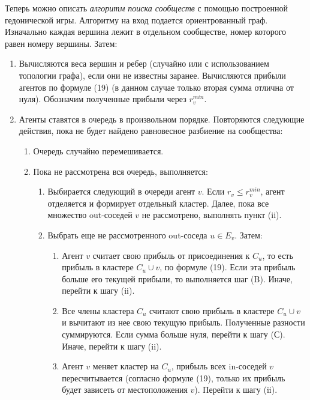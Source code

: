 Теперь можно описать \textit{алгоритм поиска сообществ} с помощью построенной гедонической игры. Алгоритму на вход подается ориентрованный граф. Изначально каждая вершина лежит в отдельном сообществе, номер которого равен номеру вершины. Затем:
\begin{enumerate}
	\item Вычисляются веса вершин и ребер (случайно или с использованием топологии графа), если они не известны заранее. Вычисляются прибыли агентов по формуле (19) (в данном случае только вторая сумма отлична от нуля). Обозначим полученные прибыли через $r_v^{min}$.
	
	\item Агенты ставятся в очередь в произвольном порядке. Повторяются следующие действия, пока не будет найдено равновесное разбиение на сообщества:
	
	\begin{enumerate}
		\item Очередь случайно перемешивается. 
		\item Пока не рассмотрена вся очередь, выполняется:
		
		\begin{enumerate}
			\item Выбирается следующий в очереди агент $v$. Если $r_v \leq r_v^{min}$, агент отделяется и формирует отдельный кластер. Далее, пока все множество out-соседей $v$ не рассмотрено, выполнять пункт (ii).
			\item Выбрать еще не рассмотренного out-соседа $u\in E_v$. Затем:
		
			\begin{enumerate}
				\item Агент $v$ считает свою прибыль от присоединения к $C_u$, то есть прибыль в кластере $C_u\cup v$, по формуле (19). Если эта прибыль больше его текущей прибыли, то выполняется шаг (B). Иначе, перейти к шагу (ii).
				\item Все члены кластера $C_u$ считают свою прибыль в кластере $C_u\cup v$ и вычитают из нее свою текущую прибыль. Полученные разности суммируются. Если сумма больше нуля, перейти к шагу (С). Иначе, перейти к шагу (ii).
				\item Агент $v$ меняет кластер на $C_u$, прибыль всех in-соседей $v$ пересчитывается (согласно формуле (19), только их прибыль будет зависеть от местоположения $v$). Перейти к шагу (ii).
			\end{enumerate}
		\end{enumerate}
	\end{enumerate} 
\end{enumerate}

